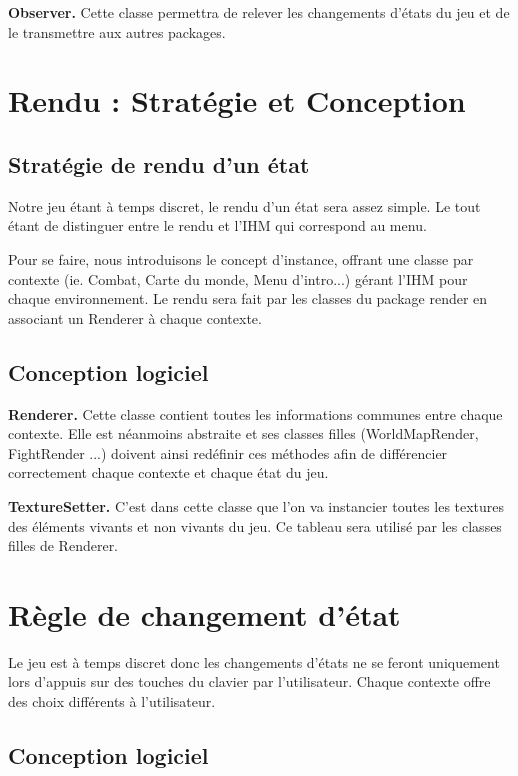 \documentclass[12pt,a4paper]{report}
\begin{document}
\textbf{Observer.} Cette classe permettra de relever les changements d'\'{e}tats du jeu et de le transmettre aux autres packages.


\chapter{Rendu : Strat\'{e}gie et Conception}
\section{Strat\'{e}gie de rendu d'un état}
Notre jeu \'{e}tant à temps discret, le rendu d'un \'{e}tat sera assez simple. Le tout étant de distinguer entre le rendu et l'IHM qui correspond au menu.

Pour se faire, nous introduisons le concept d'instance, offrant une classe par contexte (ie. Combat, Carte du monde, Menu d'intro...) g\'{e}rant l'IHM pour chaque environnement. Le rendu sera fait par les classes du package render en associant un Renderer à chaque contexte.

\section{Conception logiciel}

\textbf{Renderer.} Cette classe contient toutes les informations communes entre chaque contexte. Elle est néanmoins abstraite et ses classes filles (WorldMapRender, FightRender ...) doivent ainsi red\'{e}finir ces m\'{e}thodes afin de diff\'{e}rencier correctement chaque contexte et chaque \'{e}tat du jeu.

\textbf{TextureSetter.} C'est dans cette classe que l'on va instancier toutes les textures des \'{e}l\'{e}ments vivants et non vivants du jeu. Ce tableau sera utilis\'{e} par les classes filles de Renderer.


\chapter{R\`{e}gle de changement d'\'{e}tat}

Le jeu est \`{a} temps discret donc les changements d'\'{e}tats ne se feront uniquement lors d'appuis sur des touches du clavier par l'utilisateur. Chaque contexte offre des choix diff\'{e}rents \`{a} l'utilisateur. 

\section{Conception logiciel}
\end{document}
